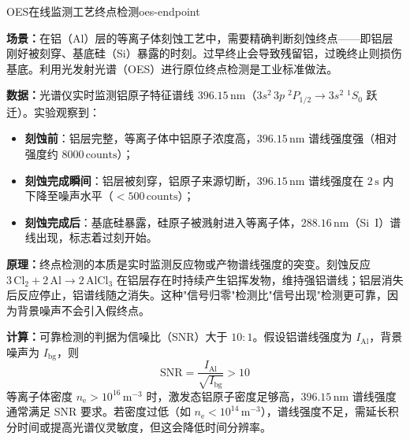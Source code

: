 \documentclass[12pt,a4paper,openany,oneside]{book}
\newcommand{\ee}{\mathrm{e}}
\newcommand{\difficulty}[1]{\marginnote{\hfill\textcolor{coverMid!80}{\rule[-0.1em]{2pt}{0.9em}}\,\textcolor{coverMid}{\footnotesize\textbf{[#1]}}}}
\begin{document}
\begin{example}{OES在线监测工艺终点检测}{oes-endpoint}
\difficulty{基础}

\textbf{场景：}在铝（Al）层的等离子体刻蚀工艺中，需要精确判断刻蚀终点——即铝层刚好被刻穿、基底硅（Si）暴露的时刻。过早终止会导致残留铝，过晚终止则损伤基底。利用光发射光谱（OES）进行原位终点检测是工业标准做法。

\textbf{数据：}光谱仪实时监测铝原子特征谱线 $396.15\,\mathrm{nm}$（$3s^2\,3p\;^2P_{1/2} \to 3s^2\;^1S_0$ 跃迁）。实验观察到：
\begin{itemize}
\item \textbf{刻蚀前}：铝层完整，等离子体中铝原子浓度高，$396.15\,\mathrm{nm}$ 谱线强度强（相对强度约 $8000\,\mathrm{counts}$）；
\item \textbf{刻蚀完成瞬间}：铝层被刻穿，铝原子来源切断，$396.15\,\mathrm{nm}$ 谱线强度在 $2\,\mathrm{s}$ 内下降至噪声水平（$< 500\,\mathrm{counts}$）；
\item \textbf{刻蚀完成后}：基底硅暴露，硅原子被溅射进入等离子体，$288.16\,\mathrm{nm}$（Si~I）谱线出现，标志着过刻开始。
\end{itemize}

\textbf{原理：}终点检测的本质是实时监测反应物或产物谱线强度的突变。刻蚀反应 $3\,\mathrm{Cl}_2 + 2\,\mathrm{Al} \to 2\,\mathrm{AlCl}_3$ 在铝层存在时持续产生铝挥发物，维持强铝谱线；铝层消失后反应停止，铝谱线随之消失。这种"信号归零"检测比"信号出现"检测更可靠，因为背景噪声不会引入假终点。

\textbf{计算：}可靠检测的判据为信噪比（SNR）大于 $10:1$。假设铝谱线强度为 $I_\mathrm{Al}$，背景噪声为 $I_\mathrm{bg}$，则
\[
\mathrm{SNR} = \frac{I_\mathrm{Al}}{\sqrt{I_\mathrm{bg}}} > 10
\]
等离子体密度 $n_\ee > 10^{16}\,\mathrm{m}^{-3}$ 时，激发态铝原子密度足够高，$396.15\,\mathrm{nm}$ 谱线强度通常满足 SNR 要求。若密度过低（如 $n_\ee < 10^{14}\,\mathrm{m}^{-3}$），谱线强度不足，需延长积分时间或提高光谱仪灵敏度，但这会降低时间分辨率。
\end{example}
\end{document}

